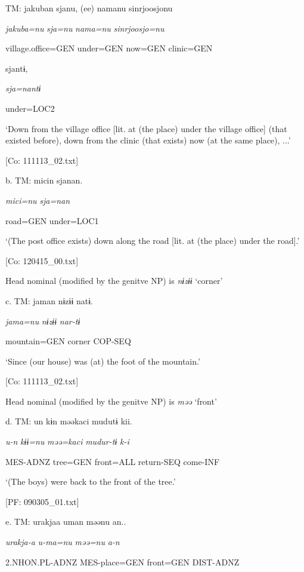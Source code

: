     TM:  jakuban  sjanu,  (ee)  namanu  {\textbar}sinrjoosjo{\textbar}nu

      \textit{jakuba=nu}  \textit{sja=nu}    \textit{nama=nu}  \textit{sinrjoosjo=nu}

      village.office=GEN  under=GEN    now=GEN  clinic=GEN

      sjantɨ,

      \textit{sja=nantɨ}

      under=LOC2

      ‘Down from the village office [lit. at (the place) under the village office] (that existed before), down from the clinic (that exists) now (at the same place), ...’

      [Co: 111113\_02.txt]

  b.  TM:  micin  sjanan.

      \textit{mici=nu}  \textit{sja=nan}

      road=GEN  under=LOC1

      ‘(The post office exists) down along the road [lit. at (the place) under the road].’

      [Co: 120415\_00.txt]

  Head nominal (modified by the genitve NP) is \textit{nɨzɨɨ} ‘corner’

  c.  TM:  jaman  nɨzɨɨ  natɨ.

      \textit{jama=nu}  \textit{nɨzɨɨ}  \textit{nar-tɨ}

      mountain=GEN  corner  COP-SEQ

      ‘Since (our house) was (at) the foot of the mountain.’

      [Co: 111113\_02.txt]

  Head nominal (modified by the genitve NP) is \textit{məə} ‘front’

  d.  TM:  un  kɨn  məəkaci  mudutɨ  kii.

      \textit{u-n}  \textit{kɨɨ=nu}  \textit{məə=kaci}  \textit{mudur-tɨ}  \textit{k-i}

      MES-ADNZ  tree=GEN  front=ALL  return-SEQ  come-INF

      ‘(The boys) were back to the front of the tree.’

      [PF: 090305\_01.txt]

  e.  TM:  urakjaa  uman  məənu  an..

      \textit{urakja-a}  \textit{u-ma=nu}  \textit{məə=nu}  \textit{a-n}

      2.NHON.PL-ADNZ  MES-place=GEN  front=GEN  DIST-ADNZ

